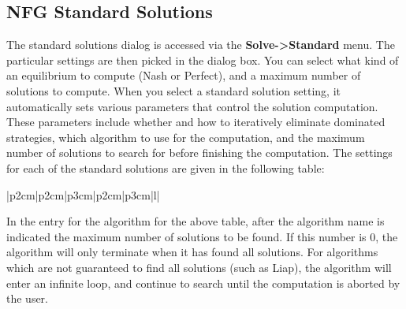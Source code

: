 \documentclass[12pt]{report}
\begin{document}
\subsection{NFG Standard Solutions}\label{NFGStandardSolutions}

The standard solutions dialog is accessed via the {\bf Solve->Standard} 
menu.  The particular settings are then picked in the dialog box.  You
can select what kind of an equilibrium to compute (Nash or Perfect),
and a maximum number of solutions to compute.  When you select a
standard solution setting, it automatically sets various parameters
that control the solution computation.  These parameters include
whether and how to iteratively eliminate dominated strategies, which
algorithm to use for the computation, and the maximum number of
solutions to search for before finishing the computation.  The
settings for each of the standard solutions are given in the following
table:

\begin{tabular}{|p{2cm}|p{2cm}|p{3cm}|p{2cm}|p{3cm}|l|}
\hline
{}
\hline
{}
\hline
{}
\hline
\hline
{}
\hline
{}
\hline
{}
\hline
\end{tabular}

In the entry for the algorithm for the above table, after the algorithm name is 
indicated the maximum number of solutions 
to be found.  If this number is 0, the algorithm will only terminate when it has found 
all solutions.  For algorithms which are not guaranteed to find all solutions (such 
as Liap), the 
algorithm will enter an infinite loop, and continue to search until the computation is 
aborted by the user. 
 
\end{document}
